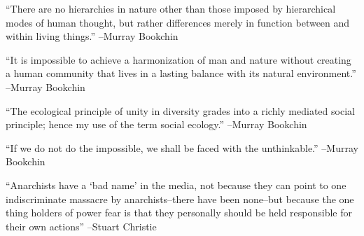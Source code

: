 \documentclass{article}%
\begin{document}
\linebreak%
\vspace{1mm}%
\begin{minipage}{\textwidth}%
\flushleft%
“There are no hierarchies in nature other than those imposed by hierarchical modes of human thought, but rather differences merely in function between and within living things.”%
\linebreak%
\vspace{1mm}%
–Murray Bookchin%
\linebreak%
\vspace{1mm}%
\end{minipage}%
\linebreak%
\vspace{1mm}%
\begin{minipage}{\textwidth}%
\flushleft%
“It is impossible to achieve a harmonization of man and nature without creating a human community that lives in a lasting balance with its natural environment.”%
\linebreak%
\vspace{1mm}%
–Murray Bookchin%
\linebreak%
\vspace{1mm}%
\end{minipage}%
\linebreak%
\vspace{1mm}%
\begin{minipage}{\textwidth}%
\flushleft%
“The ecological principle of unity in diversity grades into a richly mediated social principle; hence my use of the term social ecology.”%
\linebreak%
\vspace{1mm}%
–Murray Bookchin%
\linebreak%
\vspace{1mm}%
\end{minipage}%
\linebreak%
\vspace{1mm}%
\begin{minipage}{\textwidth}%
\flushleft%
“If we do not do the impossible, we shall be faced with the unthinkable.”%
\linebreak%
\vspace{1mm}%
–Murray Bookchin%
\linebreak%
\vspace{1mm}%
\end{minipage}%
\linebreak%
\vspace{1mm}%
\begin{minipage}{\textwidth}%
\flushleft%
“Anarchists have a ‘bad name’ in the media, not because they can point to one indiscriminate massacre by anarchists–there have been none–but because the one thing holders of power fear is that they personally should be held responsible for their own actions”%
\linebreak%
\vspace{1mm}%
–Stuart Christie%
\linebreak%
\vspace{1mm}%
\end{minipage}%
\end{document}

